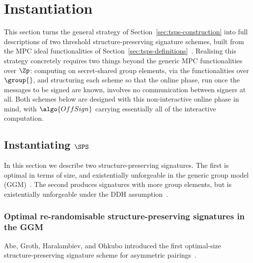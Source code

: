 \section{Instantiation}\label{sec:tsps-instantiation}

This section turns the general strategy of Section~\ref{sec:tsps-construction}
into full descriptions of two threshold structure-preserving signature schemes,
built from the MPC ideal functionalities of
Section~\ref{sec:tsps-definitions}~\cite{C:AGHO11,C:KilPanWee15}. Realising
this strategy concretely requires two things beyond the generic MPC
functionalities over $\Zp$: computing on secret-shared group elements, via the
functionalities over $\group{}$, and structuring each scheme so that the online
phase, run once the messages to be signed are known, involves no communication
between signers at all. Both schemes below are designed with this
non-interactive online phase in mind, with $\algo{OffSign}$ carrying
essentially all of the interactive computation.

\subsection{Instantiating $\SPS$}

In this section we describe two structure-preserving signatures.  The first is
optimal in terms of size, and existentially unforgeable in the generic group
model (GGM)~\cite{C:AGHO11}. The second produces signatures with more group
elements, but is existentially unforgeable under the DDH
assumption~\cite{C:KilPanWee15}.

\subsubsection{Optimal re-randomisable structure-preserving signatures in the
GGM}\label{sec:sps-ggm}

Abe, Groth, Haralambiev, and Ohkubo introduced the first optimal-size
structure-preserving signature scheme for asymmetric pairings~\cite{C:AGHO11}.

